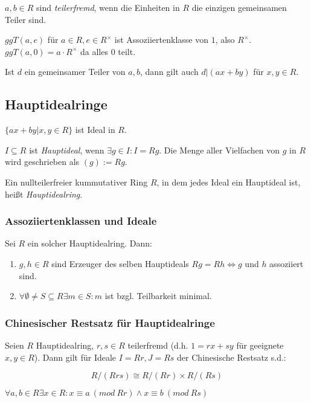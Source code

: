 $a, b \in R$ sind \emph{teilerfremd}, wenn die Einheiten in $R$ die einzigen gemeinsamen Teiler sind.

\spacing

$ggT(a,e)$ für $a \in R, e \in R^\times$ ist Assoziiertenklasse von $1$, also $R^\times$. $ggT(a,0) = a\cdot R^\times$ da alles $0$ teilt.

Ist $d$ ein gemeinsamer Teiler von $a, b$, dann gilt auch $d |(ax+by)$ für $x,y \in R$.

\subsection*{Hauptidealringe}

$\{ax+by | x,y \in R\}$ ist Ideal in $R$.

$I \subseteq R$ ist \emph{Hauptideal}, wenn $\exists g \in I : I = Rg$. Die Menge aller Vielfachen von $g$ in $R$ wird geschrieben als $(g) := Rg$.

\spacing

Ein nullteilerfreier kummutativer Ring $R$, in dem jedes Ideal ein Hauptideal ist, heißt \emph{Hauptidealring}.

\subsubsection*{Assoziiertenklassen und Ideale}

Sei $R$ ein solcher Hauptidealring. Dann:

\begin{enumerate}[label=(\alph*)]
	\item $g, h \in R$ sind Erzeuger des selben Hauptideals $Rg = Rh \iff g$ und $h$ assoziiert sind.
	\item $\forall \emptyset \neq S \subseteq R \exists m \in S : m$ ist bzgl. Teilbarkeit minimal.
\end{enumerate}

\subsubsection*{Chinesischer Restsatz für Hauptidealringe}

Seien $R$ Hauptidealring, $r, s \in R$ teilerfremd (d.h. $1=rx+sy$ für geeignete $x, y \in R$). Dann gilt für Ideale $I = Rr, J = Rs$ der Chinesische Restsatz s.d.:

\vspace*{-2mm}
$$R/(Rrs) \cong R/(Rr) \times R/(Rs)$$

$\forall a, b \in R \exists x \in R : x \equiv a \ (mod \ Rr) \land x \equiv b \ (mod \ Rs)$
